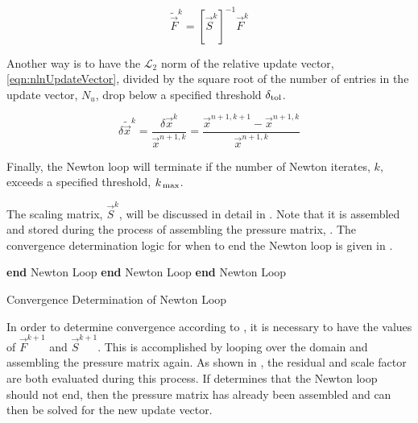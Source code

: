 \begin{equation}
\label{eqn:nlnScaledResidual}
\tilde{\vec{F}}^{k} = \left[\vec{S}^{k}\right]^{-1}\vec{F}^{k}
\end{equation}

Another way is to have the $\mathcal{L}_{2}$ norm of the relative update vector, \eqref{eqn:nlnUpdateVector}, divided by the square root of the number of entries in the update vector, $N_{u}$, drop below a specified threshold $\dtol{}$.

\begin{equation}
\label{eqn:nlnUpdateVector}
\delta \tilde{\vec{x}}^{k} = \frac{\delta \vec{x}^{k}}{\vec{x}^{n+1, k}} = \frac{ \vec{x}^{n+1, k+1} - \vec{x}^{n+1, k}}{\vec{x}^{n+1,k}}
\end{equation}

Finally, the Newton loop will terminate if the number of Newton iterates, $k$, exceeds a specified threshold, $\kmax{}$.

The scaling matrix, $\vec{S}^{k}$, will be discussed in detail in .
Note that it is assembled and stored during the process of assembling the pressure matrix, .
The convergence determination logic for when to end the Newton loop is given in .

\begin{algo}[ht!]
\setlength{\baselineskip}{0.625\baselineskip}
\begin{algorithmic}[1]
	\State \textbf{end} Newton Loop
	\State \textbf{end} Newton Loop
	\State \textbf{end} Newton Loop
\EndIf
\end{algorithmic}
\caption{Convergence Determination of Newton Loop}
\label{alg:nlnConvergence}
\end{algo}

In order to determine convergence according to , it is necessary to have the values of $\vec{F}^{k+1}$ and $\vec{S}^{k+1}$.
This is accomplished by looping over the domain and assembling the pressure matrix again.
As shown in , the residual and scale factor are both evaluated during this process.
If  determines that the Newton loop should not end, then the pressure matrix has already been  assembled and can then be solved for the new update vector.

